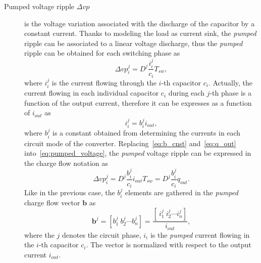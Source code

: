 \begin{description}
  \item[Pumped voltage ripple $\Delta vp$] is the voltage variation associated with the discharge of the capacitor by a constant current. Thanks to modeling the load as current sink, the \emph{pumped} ripple can be associated to a linear voltage discharge, thus the \emph{pumped} ripple can be obtained for each switching phase as
      \begin{equation}
        \Delta {vp}^j_i  = D^j \frac{i_i^j}{c_i }T_{sw},
      \label{eq:pumped_voltage}
      \end{equation}
      where $i_i^j$ is the current flowing through the $i$-th capacitor $c_i$. Actually, the current flowing in each individual capacitor $c_i$ during each $j$-th phase is a function of the output current, therefore it can be expresses as a function of $i_{out}$ as
      \begin{equation}
        i_i^j = b_i^j i_{out} ,
      \label{eq:b_cnst}
      \end{equation}
      where $b_i^j$ is a constant obtained from determining the currents in each circuit mode of the converter. Replacing~\eqref{eq:b_cnst} and~\eqref{eq:q_out} into~\eqref{eq:pumped_voltage}, the \emph{pumped} voltage ripple can be expressed in the charge flow notation as
      \begin{equation}
        \Delta {vp}^j_i  = D^j \frac{b_i^j}{c_i } {i_{out}} {T_{sw}} = D^j \frac{b_i^j}{c_i } {q_{out}}.
      \label{eq:pumped_voltage_cf}
      \end{equation}
      Like in the previous case, the $b_i^j$ elements are gathered in the \emph{pumped} charge flow vector $\mathbf{b}$ as
      \begin{equation}
        \mathbf{b}^j =  \left[ b_1^j~b_2^j \cdots b_n^j \right] = \frac{\left[ ~i_1^j~i_2^j \cdots i_n^j \right]}{i_{out}},
      \label{eq:b_vector}
      \end{equation}
      where the $j$ denotes the circuit phase, $i_i$ is the \emph{pumped} current flowing in the $i$-th capacitor $c_i$. The vector is normalized with respect to the output current $i_{out}$.



\end{description}
